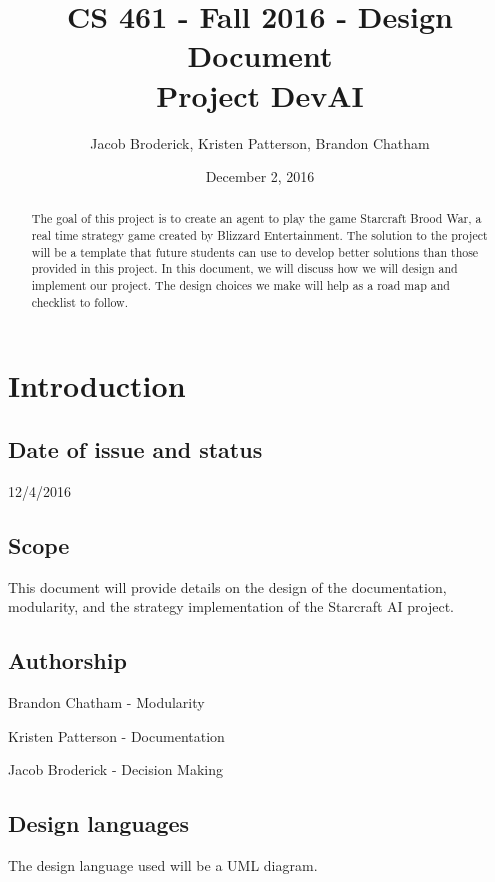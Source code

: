 \documentclass[10pt,letterpaper,onecolumn,draftclsnofoot]{IEEEtran}
\begin{document}
\begin{titlepage}

  \title{CS 461 - Fall 2016 - Design Document \\ Project DevAI}
  \author{Jacob Broderick, Kristen Patterson, Brandon Chatham}
  \date{December 2, 2016}
  \maketitle
  \vspace{4cm}
  \begin{abstract}
  	\noindent 
  	  	\noindent
	The goal of this project is to create an agent to play the game Starcraft Brood War, a real time strategy game created by Blizzard Entertainment. The solution to the project will be a template that future students can use to develop better solutions than those provided in this project. In this document, we will discuss how we will design and implement our project. The design choices we make will help as a road map and checklist to follow.
   \end{abstract}
\end{titlepage}

\tableofcontents

\newpage

\section{Introduction}
\subsection{Date of issue and status}
12/4/2016
\subsection{Scope}
	This document will provide details on the design of the documentation, modularity, and the strategy implementation of the Starcraft AI project.
	
\subsection{Authorship}
Brandon Chatham - Modularity

Kristen Patterson - Documentation

Jacob Broderick - Decision Making
\subsection{Design languages}
	The design language used will be a UML diagram.
\end{document}
